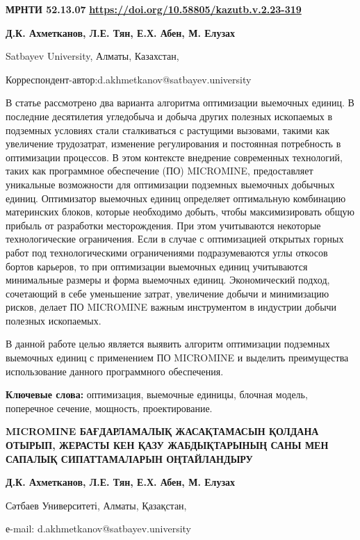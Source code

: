 \newpage
{\bfseries МРНТИ 52.13.07}
\hfill {\bfseries \href{https://doi.org/10.58805/kazutb.v.2.23-319}{https://doi.org/10.58805/kazutb.v.2.23-319}}


\begin{center}
{\bfseries Д.К. Ахметканов\envelope, Л.Е. Тян, Е.Х. Абен, М. Елузах}

Satbayev University, Алматы, Казахстан,

\envelope Корреспондент-автор:d.akhmetkanov@satbayev.university
\end{center}

В статье рассмотрено два варианта алгоритма оптимизации выемочных
единиц. В последние десятилетия угледобыча и добыча других полезных
ископаемых в подземных условиях стали сталкиваться с растущими вызовами,
такими как увеличение трудозатрат, изменение регулирования и постоянная
потребность в оптимизации процессов. В этом контексте внедрение
современных технологий, таких как программное обеспечение (ПО)
MICROMINE, предоставляет уникальные возможности для оптимизации
подземных выемочных добычных единиц. Оптимизатор выемочных единиц
определяет оптимальную комбинацию материнских блоков, которые необходимо
добыть, чтобы максимизировать общую прибыль от разработки месторождения.
При этом учитываются некоторые технологические ограничения. Если в
случае с оптимизацией открытых горных работ под технологическими
ограничениями подразумеваются углы откосов бортов карьеров, то при
оптимизации выемочных единиц учитываются минимальные размеры и форма
выемочных единиц. Экономический подход, сочетающий в себе уменьшение
затрат, увеличение добычи и минимизацию рисков, делает ПО MICROMINE
важным инструментом в индустрии добычи полезных ископаемых.

В данной работе целью является выявить алгоритм оптимизации подземных
выемочных единиц с применением ПО MICROMINE и выделить преимущества
использование данного программного обеспечения.

{\bfseries Ключевые слова:} оптимизация, выемочные единицы, блочная модель,
поперечное сечение, мощность, проектирование.

\begin{center}
{\large\bfseries MICROMINE БАҒДАРЛАМАЛЫҚ ЖАСАҚТАМАСЫН ҚОЛДАНА ОТЫРЫП, ЖЕРАСТЫ КЕН
ҚАЗУ ЖАБДЫҚТАРЫНЫҢ САНЫ МЕН САПАЛЫҚ СИПАТТАМАЛАРЫН ОҢТАЙЛАНДЫРУ}

{\bfseries Д.К. Ахметканов\envelope, Л.Е. Тян, Е.Х. Абен, М.
Елузах}

Сәтбаев Университеті, Алматы, Қазақстан,

е-mail: d.akhmetkanov@satbayev.university
\end{center}

